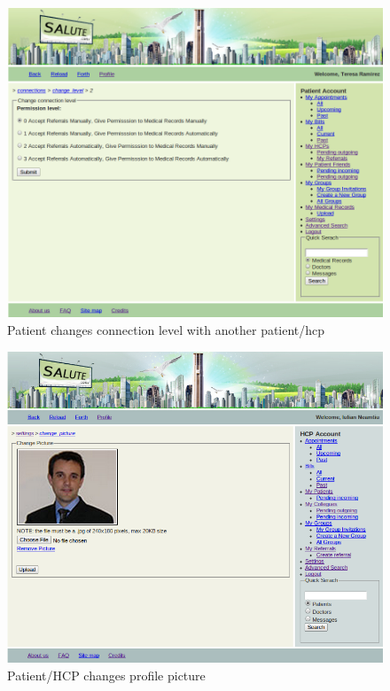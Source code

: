 \begin{figure}
\includegraphics[scale=0.5]{screenshots/change_connection_level.png}
\caption{Patient changes connection level with another patient/hcp}
\end{figure}

\begin{figure}
\includegraphics[scale=0.5]{screenshots/change_picture.png}
\caption{Patient/HCP changes profile picture}
\end{figure}

